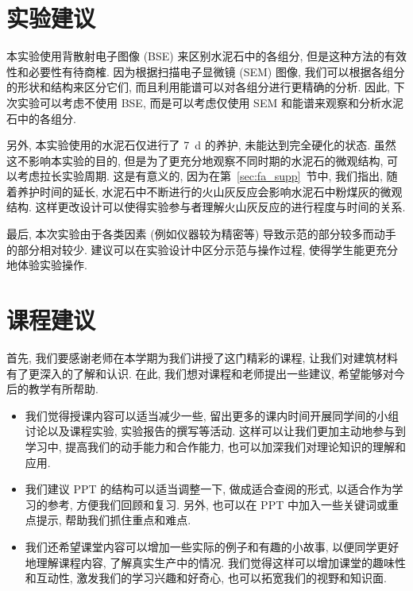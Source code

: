 
\section{实验建议}

本实验使用背散射电子图像 (BSE) 来区别水泥石中的各组分, 但是这种方法的有效性和必要性有待商榷.
因为根据扫描电子显微镜 (SEM) 图像, 我们可以根据各组分的形状和结构来区分它们, 而且利用能谱可以对各组分进行更精确的分析.
因此, 下次实验可以考虑不使用 BSE, 而是可以考虑仅使用 SEM 和能谱来观察和分析水泥石中的各组分.

另外, 本实验使用的水泥石仅进行了 \SI{7}{\day} 的养护, 未能达到完全硬化的状态.
虽然这不影响本实验的目的, 但是为了更充分地观察不同时期的水泥石的微观结构, 可以考虑拉长实验周期. 这是有意义的, 因为在第~\ref{sec:fa_supp}~节中, 我们指出, 随着养护时间的延长, 水泥石中不断进行的火山灰反应会影响水泥石中粉煤灰的微观结构. 这样更改设计可以使得实验参与者理解火山灰反应的进行程度与时间的关系.

最后, 本次实验由于各类因素 (例如仪器较为精密等) 导致示范的部分较多而动手的部分相对较少.
建议可以在实验设计中区分示范与操作过程, 使得学生能更充分地体验实验操作.

\section{课程建议}


首先, 我们要感谢老师在本学期为我们讲授了这门精彩的课程, 让我们对建筑材料有了更深入的了解和认识.
在此, 我们想对课程和老师提出一些建议, 希望能够对今后的教学有所帮助.

\begin{itemize}
  \item 我们觉得授课内容可以适当减少一些, 留出更多的课内时间开展同学间的小组讨论以及课程实验, 实验报告的撰写等活动.
        这样可以让我们更加主动地参与到学习中, 提高我们的动手能力和合作能力, 也可以加深我们对理论知识的理解和应用.
  \item 我们建议 PPT 的结构可以适当调整一下, 做成适合查阅的形式, 以适合作为学习的参考, 方便我们回顾和复习.
        另外, 也可以在 PPT 中加入一些关键词或重点提示, 帮助我们抓住重点和难点.
  \item 我们还希望课堂内容可以增加一些实际的例子和有趣的小故事, 以便同学更好地理解课程内容, 了解真实生产中的情况.
        我们觉得这样可以增加课堂的趣味性和互动性, 激发我们的学习兴趣和好奇心, 也可以拓宽我们的视野和知识面.
\end{itemize}


